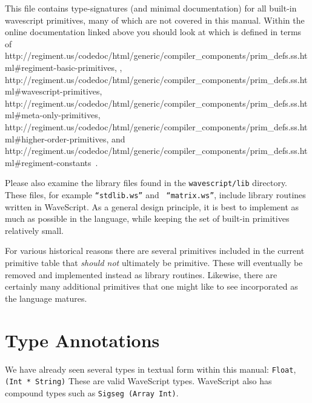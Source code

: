 \documentclass[twocolumn]{report}
\begin{document}
This file contains type-signatures (and minimal documentation) for all built-in
wavescript primitives, many of which are not covered in this manual.
Within the online documentation linked above you should look at 
which is defined in terms of 
      {http://regiment.us/codedoc/html/generic/compiler\_components/prim\_defs.ss.html\#regiment-basic-primitives},
,
          {http://regiment.us/codedoc/html/generic/compiler\_components/prim\_defs.ss.html\#wavescript-primitives},
           {http://regiment.us/codedoc/html/generic/compiler\_components/prim\_defs.ss.html\#meta-only-primitives},
        {http://regiment.us/codedoc/html/generic/compiler\_components/prim\_defs.ss.html\#higher-order-primitives},
and
             {http://regiment.us/codedoc/html/generic/compiler\_components/prim\_defs.ss.html\#regiment-constants}~.

Please also examine the library files found in the {\tt wavescript/lib}
directory.  These files, for example {\tt ``stdlib.ws''} and {\tt
  ``matrix.ws''}, include library routines written in WaveScript.  As
a general design principle, it is best to implement as much as
possible in the language, while keeping the set of built-in primitives
relatively small.

For various historical reasons there are several primitives included
in the current primitive table that {\em should not} ultimately be
primitive.  These will eventually be removed and implemented instead
as library routines.  Likewise, there are certainly many additional
primitives that one might like to see incorporated as the language matures.


\section{Type Annotations}

We have already seen several types in textual form within this manual:
{\tt Float}, {\tt (Int * String)} These are valid WaveScript types.
WaveScript also has compound types such as {\tt Sigseg (Array Int)}.
\end{document}
